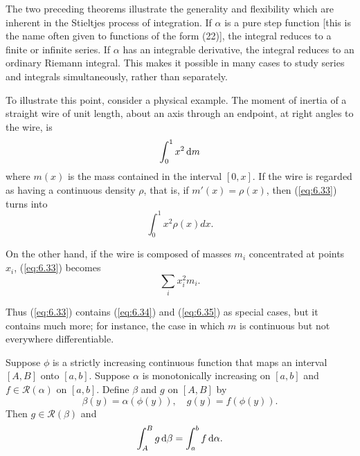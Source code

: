 \begin{myRemark}
    \label{myRemark:6.18}
    The two preceding theorems illustrate the generality and flexibility which are inherent in the Stieltjes process of integration. 
    If $\alpha$ is a pure step function 
    [this is the name often given to functions of the form (22)], 
    the integral reduces to a finite or infinite series. 
    If $\alpha$ has an integrable derivative, 
    the integral reduces to an ordinary Riemann integral. 
    This makes it possible in many cases to study series and integrals simultaneously, rather than separately.
    
    To illustrate this point, consider a physical example. 
    The moment of inertia of a straight wire of unit length, 
    about an axis through an endpoint, at right angles to the wire, is
    \begin{equation}
        \label{eq:6.33}
        \int_{0}^{1} x^2 \d m
    \end{equation}
    where $m(x)$ is the mass contained in the interval $[0, x]$. 
    If the wire is regarded as having a continuous density $\rho$, 
    that is, if $m'(x) = \rho(x)$, then (\ref{eq:6.33}) turns into
    \begin{equation}
        \label{eq:6.34}
        \int_{0}^{1} x^2 \rho(x) dx.
    \end{equation}
    
    On the other hand, 
    if the wire is composed of masses $m_i$ concentrated at points $x_i$, 
    (\ref{eq:6.33}) becomes
    \begin{equation}
        \label{eq:6.35}
        \sum_{i} x_i^2 m_i.
    \end{equation}
    
    Thus (\ref{eq:6.33}) contains (\ref{eq:6.34}) and (\ref{eq:6.35}) as special cases, but it contains much more; 
    for instance, the case in which $m$ is continuous but not everywhere differentiable.
\end{myRemark}

\begin{thm}
    \label{thm:6.19}
    Suppose $\phi$ is a strictly increasing continuous function that
    maps an interval $[A, B]$ onto $[a, b]$. 
    Suppose $\alpha$ is monotonically increasing on $[a, b]$ and
    $f \in \mathscr{R}(\alpha)$ on $[a, b]$. 
    Define $\beta$ and $g$ on $[A, B]$ by
    \begin{equation}
        \label{eq:6.36}
        \beta(y) = \alpha(\phi(y)),
        \quad 
        g(y) = f(\phi(y)).
    \end{equation}
    Then $g \in \mathscr{R}(\beta)$ and 
    \begin{equation}
        \label{eq:6.37}
        \int_{A}^{B} g \d \beta =
        \int_{a}^{b} f \d \alpha.
    \end{equation}
\end{thm}
